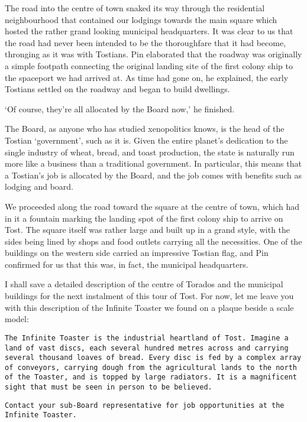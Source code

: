 The road into the centre of town snaked its way through the
residential neighbourhood that contained our lodgings towards the main
square which hosted the rather grand looking municipal
headquarters. It was clear to us that the road had never been intended
to be the thoroughfare that it had become, thronging as it was with
Tostians. Pin elaborated that the roadway was originally a simple
footpath connecting the original landing site of the first colony ship
to the spaceport we had arrived at. As time had gone on, he explained,
the early Tostians settled on the roadway and began to build
dwellings.

`Of course, they're all allocated by the Board now,' he finished.

The Board, as anyone who has studied xenopolitics knows, is the head
of the Tostian `government', such as it is. Given the entire planet's
dedication to the single industry of wheat, bread, and toast
production, the state is naturally run more like a business than a
traditional government. In particular, this means that a Tostian's job
is allocated by the Board, and the job comes with benefits such as
lodging and board.

We proceeded along the road toward the square at the centre of town,
which had in it a fountain marking the landing spot of the first
colony ship to arrive on Tost. The square itself was rather large and
built up in a grand style, with the sides being lined by shops and
food outlets carrying all the necessities. One of the buildings on the
western side carried an impressive Tostian flag, and Pin confirmed for
us that this was, in fact, the municipal headquarters.

I shall save a detailed description of the centre of Torados and the
municipal buildings for the next instalment of this tour of Tost. For
now, let me leave you with this description of the Infinite Toaster we
found on a plaque beside a scale model:

\vspace{\baselineskip}
\begin{center}
    \parbox{0.7\textwidth}{\texttt{The Infinite Toaster is the industrial
      heartland of Tost. Imagine a land of vast discs, each several
      hundred metres across and carrying several thousand loaves of
      bread. Every disc is fed by a complex array of conveyors,
      carrying dough from the agricultural lands to the north of the
      Toaster, and is topped by large radiators. It is a magnificent
      sight that must be seen in person to be believed.}}
    \par
    \parbox{0.7\textwidth}{\texttt{Contact your sub-Board representative for
      job opportunities at the Infinite Toaster.}}
\end{center}

